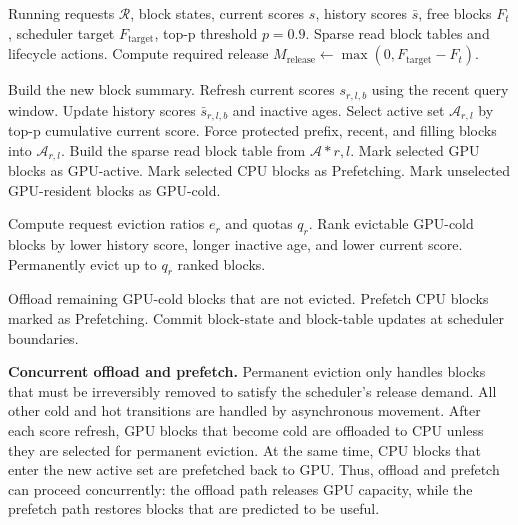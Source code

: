 \documentclass[sigplan,10pt,review,anonymous]{acmart}
\begin{document}
\begin{algorithm}[t]
\caption{\textsc{KVCore}: Sparse-guided KV Lifecycle Update}
\label{alg:lifecycle}
\small
\begin{algorithmic}[1]
\Require Running requests $\mathcal{R}$, block states, current scores $s$, history scores $\bar{s}$, free blocks $F_t$, scheduler target $F_{\mathrm{target}}$, top-p threshold $p=0.9$.
\Ensure Sparse read block tables and lifecycle actions.
\State Compute required release $M_{\mathrm{release}} \leftarrow \max(0, F_{\mathrm{target}} - F_t)$.

\State Build the new block summary.
\State Refresh current scores $s_{r,l,b}$ using the recent query window.
\State Update history scores $\bar{s}_{r,l,b}$ and inactive ages.
\EndIf
\State Select active set $\mathcal{A}_{r,l}$ by top-p cumulative current score.
\State Force protected prefix, recent, and filling blocks into $\mathcal{A}_{r,l}$.
\State Build the sparse read block table from $\mathcal{A}*{r,l}$.
\State Mark selected GPU blocks as GPU-active.
\State Mark selected CPU blocks as Prefetching.
\State Mark unselected GPU-resident blocks as GPU-cold.
\EndFor

\State Compute request eviction ratios $e_r$ and quotas $q_r$.
\State Rank evictable GPU-cold blocks by lower history score, longer inactive age, and lower current score.
\State Permanently evict up to $q_r$ ranked blocks.
\EndFor
\EndIf

\State Offload remaining GPU-cold blocks that are not evicted.
\State Prefetch CPU blocks marked as Prefetching.
\State Commit block-state and block-table updates at scheduler boundaries.
\end{algorithmic}
\end{algorithm}

\noindent\textbf{Concurrent offload and prefetch.}
Permanent eviction only handles blocks that must be irreversibly removed to satisfy the scheduler's release demand.
All other cold and hot transitions are handled by asynchronous movement.
After each score refresh, GPU blocks that become cold are offloaded to CPU unless they are selected for permanent eviction.
At the same time, CPU blocks that enter the new active set are prefetched back to GPU.
Thus, offload and prefetch can proceed concurrently: the offload path releases GPU capacity, while the prefetch path restores blocks that are predicted to be useful.
\end{document}
